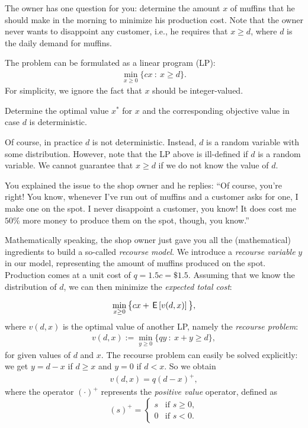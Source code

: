 \documentclass[assignments]{subfiles}
\begin{document}
The owner has one question for you: determine the amount $x$ of muffins that he should make in the morning to minimize his production cost. Note that the owner never wants to disappoint any customer, i.e., he requires that $x \geq d$, where $d$ is the daily demand for muffins.

The problem can be formulated as a linear program (LP):
\begin{align}
    \min_{x \geq 0} \{ cx \ : \ x \geq d \}.
\end{align}
For simplicity, we ignore the fact that $x$ should be integer-valued.

\begin{exercise}
Determine the optimal value $x^*$ for $x$ and the corresponding objective value in case $d$ is deterministic.
\end{exercise}

Of course, in practice $d$ is not deterministic. Instead, $d$ is a random variable with some distribution. However, note that the LP above is ill-defined if $d$ is a random variable. We cannot guarantee that $x \geq d$ if we do not know the value of $d$.

You explained the issue to the shop owner and he replies: ``Of course, you're right! You know, whenever I've run out of muffins and a customer asks for one, I make one on the spot. I never disappoint a customer, you know! It does cost me $50 \%$ more money to produce them on the spot, though, you know.''

Mathematically speaking, the shop owner just gave you all the (mathematical) ingredients to build a so-called \textit{recourse model}. We introduce a \textit{recourse variable} $y$ in our model, representing the amount of muffins produced on the spot. Production comes at a unit cost of $q = 1.5 c = \$ 1.5$. Assuming that we know the distribution of $d$, we can then minimize the \textit{expected total cost}:

\begin{align}
    \min_{x \geq 0} \big\{ cx + \,\mathsf{E}\left[v(d,x)\right] \big\},
\end{align}
where $v(d,x)$ is the optimal value of another LP, namely the \textit{recourse problem}:
\begin{align}
    v(d,x) := \min_{y \geq 0} \{ qy \ : \ x + y \geq d \},
\end{align}
for given values of $d$ and $x$. The recourse problem can easily be solved explicitly: we get $y=d-x$ if $d \geq x$ and $y=0$ if $d < x$. So we obtain
\begin{align}
    v(d,x) = q (d - x)^+,
\end{align}
where the operator $(\cdot)^+$ represents the \textit{positive value} operator, defined as
\begin{equation}
    (s)^+ = \begin{cases}
    s &\text{if } s \geq 0,\\
    0 &\text{if } s < 0.
    \end{cases}
\end{equation}
\end{document}
